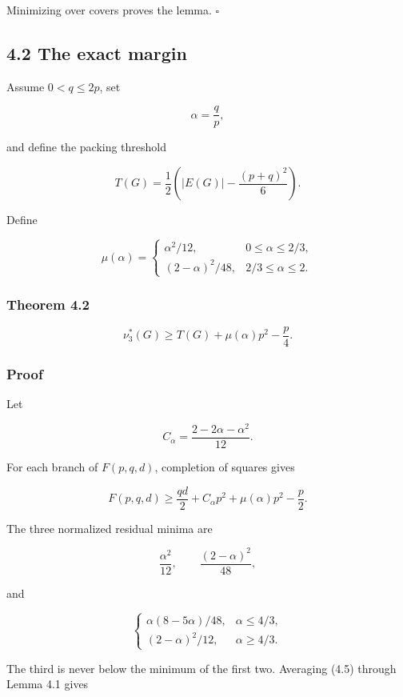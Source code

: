 \documentclass[
  11pt,
]{article}
\begin{document}
Minimizing over covers proves the lemma. \(\square\)

\subsection{4.2 The exact margin}\label{the-exact-margin}

Assume \(0<q\le2p\), set

\[
\alpha=\frac qp,
\]

and define the packing threshold

\[
T(G)=\frac12\left(|E(G)|-\frac{(p+q)^2}{6}\right).
\tag{4.2}
\]

Define

\[
\mu(\alpha)
=
\begin{cases}
\alpha^2/12,&0\le\alpha\le2/3,\\
(2-\alpha)^2/48,&2/3\le\alpha\le2.
\end{cases}
\tag{4.3}
\]

\subsubsection{Theorem 4.2}\label{theorem-4.2-unified-fractional-margin}

\[
\boxed{
\nu_3^*(G)
\ge
T(G)+\mu(\alpha)p^2-\frac p4.
}
\tag{4.4}
\]

\subsubsection{Proof}\label{proof-2}

Let

\[
C_\alpha=\frac{2-2\alpha-\alpha^2}{12}.
\]

For each branch of \(F(p,q,d)\), completion of squares gives

\[
F(p,q,d)
\ge
\frac{qd}{2}+C_\alpha p^2+\mu(\alpha)p^2-\frac p2.
\tag{4.5}
\]

The three normalized residual minima are

\[
\frac{\alpha^2}{12},
\qquad
\frac{(2-\alpha)^2}{48},
\]

and

\[
\begin{cases}
\alpha(8-5\alpha)/48,&\alpha\le4/3,\\
(2-\alpha)^2/12,&\alpha\ge4/3.
\end{cases}
\]

The third is never below the minimum of the first two. Averaging (4.5)
through Lemma 4.1 gives
\end{document}
